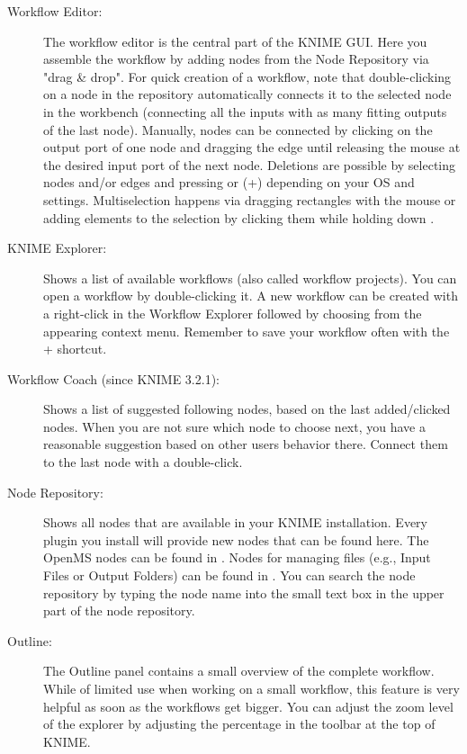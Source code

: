 \begin{description}
\item[Workflow Editor:]
The workflow editor is the central part of the KNIME GUI.
Here you assemble the workflow by adding nodes from the Node Repository via "drag \& drop". For quick creation of a 
workflow, note that double-clicking on 
a node in the repository automatically connects it to the selected node in the workbench (connecting all the inputs 
with as many fitting outputs of the last node).
Manually, nodes can be connected by clicking on the output port of one node and dragging the edge until releasing the 
mouse at the desired input port of the next node. Deletions are possible by selecting nodes and/or edges and pressing 
 or (+) depending on your OS and settings. Multiselection happens via dragging 
rectangles with the mouse or adding elements to the selection by clicking them while holding down .

\item[KNIME Explorer:]
Shows a list of available workflows (also called workflow projects).
You can open a workflow by double-clicking it.
A new workflow can be created with a right-click in the Workflow Explorer followed by choosing  from the appearing context menu.
Remember to save your workflow often with the + shortcut.

\item[Workflow Coach (since KNIME 3.2.1):]
Shows a list of suggested following nodes, based on the last added/clicked nodes.
When you are not sure which node to choose next, you have a reasonable suggestion based on other users behavior 
there. Connect them to the last node with a double-click.

\item[Node Repository:]
Shows all nodes that are available in your KNIME installation.
Every plugin you install will provide new nodes that can be found here.
The OpenMS nodes can be found in .
Nodes for managing files (e.g., Input Files or Output Folders) can be found in .
You can search the node repository by typing the node name into the small text box in the upper part of the node repository.

\item[Outline:]
The Outline panel contains a small overview of the complete workflow. While of limited use when working on a small 
workflow, this feature is very helpful as soon as the workflows get bigger. You can adjust the zoom level of the 
explorer by adjusting the percentage in the toolbar at the top of KNIME.


\end{description}

